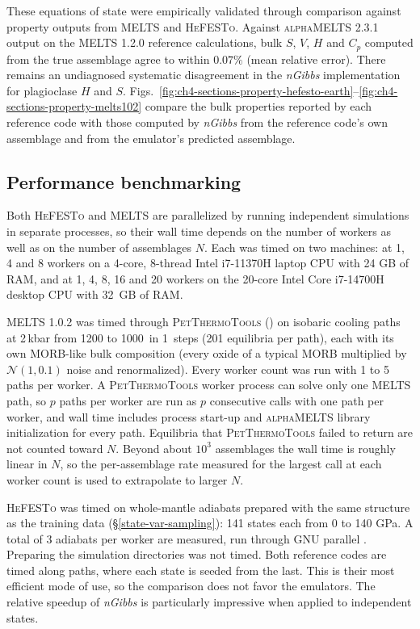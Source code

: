 These equations of state were empirically validated through comparison against property outputs from \textsc{MELTS} and \textsc{HeFESTo}. Against \textsc{alphaMELTS} 2.3.1
output on the \textsc{MELTS} 1.2.0 reference calculations, bulk $S$, $V$, $H$ and $C_p$ computed from the true assemblage agree to within $0.07\%$ (mean relative error). 
There remains an undiagnosed systematic disagreement in the \emph{nGibbs} implementation for plagioclase $H$ and $S$.
Figs.~\ref{fig:ch4-sections-property-hefesto-earth}--\ref{fig:ch4-sections-property-melts102}
compare the bulk properties reported by each reference code with those computed by \emph{nGibbs} from the reference code's own
assemblage and from the emulator's predicted assemblage.

\subsection{Performance benchmarking}\label{ch4-benchmarking}

Both \textsc{HeFESTo} and \textsc{MELTS} are parallelized by running independent simulations in separate processes, so their wall time depends on the
number of workers as well as on the number of assemblages $N$. Each was timed on two machines: at 1, 4 and 8 workers on a 4-core, 8-thread Intel i7-11370H laptop CPU with
24 GB of RAM, and at 1, 4, 8, 16 and 20 workers on the 20-core Intel Core i7-14700H desktop CPU with 32~GB of RAM.

\textsc{MELTS} 1.0.2 was timed through \textsc{PetThermoTools} () on isobaric cooling paths at 2\,kbar from 1200 to 1000\,\degC{} in 1\,\degC{}
steps (201 equilibria per path), each with its own MORB-like bulk composition (every oxide of a typical MORB multiplied by
$\mathcal{N}(1, 0.1)$ noise and renormalized). Every worker count was run with 1 to 5 paths per worker. A \textsc{PetThermoTools} worker process can solve only one
\textsc{MELTS} path, so $p$ paths per worker are run as $p$ consecutive calls with one path per worker, and wall time includes process
start-up and \textsc{alphaMELTS} library initialization for every path. Equilibria that \textsc{PetThermoTools} failed to return are not counted toward $N$. Beyond about $10^3$ assemblages the wall time is roughly linear in
$N$, so the per-assemblage rate measured for the largest call at each worker count is used to extrapolate to larger $N$. 

\textsc{HeFESTo} was timed on whole-mantle adiabats prepared with the same structure as the training data (\S\ref{state-var-sampling}): 141 states each from 0 to 140 GPa. 
A total of 3 adiabats per worker are measured, run through GNU parallel \citep{tange2021}. Preparing the simulation directories 
was not timed. Both reference codes are timed along paths, where each state is seeded from the last. This is their most efficient mode of use, so the comparison 
does not favor the emulators. The relative speedup of \emph{nGibbs} is particularly impressive when applied to independent states.


